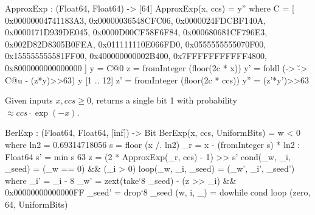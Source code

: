 \begin{code}
  ApproxExp : (Float64, Float64) -> [64]
  ApproxExp(x, ccs) = y'' where 
    C = [
            0x00000004741183A3,
            0x00000036548CFC06,
            0x0000024FDCBF140A,
            0x0000171D939DE045,
            0x0000D00CF58F6F84, 
            0x000680681CF796E3, 
            0x002D82D8305B0FEA, 
            0x011111110E066FD0,
            0x0555555555070F00, 
            0x155555555581FF00, 
            0x400000000002B400, 
            0x7FFFFFFFFFFF4800,
            0x8000000000000000
        ]
    y = C@0
    z = fromInteger (floor(2^^63 * x))
    y' = foldl (\yy -> \u -> C@u - (z*y)>>63) y [1 .. 12]
    z' = fromInteger (floor(2^^63 * ccs))
    y'' = (z'*y')>>63
\end{code}

Given inputs $x, ccs \geq 0$, \longberexp returns a single bit 1 with probability $\approx ccs \cdot \exp(-x)$.

\begin{algorithm}[!htb]
	\caption{$\berexp(x, ccs)$}\label{alg:berexp}
	\begin{algorithmic}[1]
		 \Comment{Compute the unique decomposition $x = 2^s \cdot r$, with $(r, s) \in [0, \ln 2) \times \bZ^+$}
		\Do
		 \label{line:berexp}
		 
		 
	\end{algorithmic}
\end{algorithm}

\begin{code}
  BerExp : (Float64, Float64, [inf]) -> Bit
  BerExp(x, ccs, UniformBits) = w < 0 where 
    ln2 = 0.69314718056
    s = floor (x /. ln2)
    _r = x - (fromInteger s) * ln2 : Float64
    s' = min s 63
    z = (2 * ApproxExp(_r, ccs) - 1) >> s'
    cond(_w, _i, _seed) = (_w == 0) && (_i > 0) 
    loop(_w, _i, _seed) = (_w', _i', _seed') where 
      _i' = _i - 8
      _w' = zext(take`{8} _seed) - (z >> _i) && 0x00000000000000FF
      _seed' = drop`{8} _seed
    (w, i, _) = dowhile cond loop (zero, 64, UniformBits)
\end{code}

